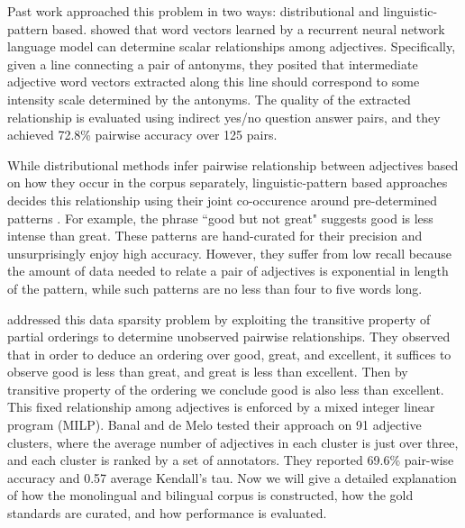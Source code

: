 Past work approached this problem in two ways: distributional and linguistic-pattern based.  showed that word vectors learned by a recurrent neural network language model can determine scalar relationships among adjectives. Specifically, given a line connecting a pair of antonyms, they posited that intermediate adjective word vectors extracted along this line should correspond to some intensity scale determined by the antonyms. The quality of the extracted relationship is evaluated using indirect yes/no question answer pairs, and they achieved 72.8\% pairwise accuracy over 125 pairs.

While distributional methods infer pairwise relationship between adjectives based on how they occur in the corpus separately, linguistic-pattern based approaches decides this relationship using their joint co-occurence around pre-determined patterns \cite{sheinman2009adjscales,schulam2010automatically,sheinman2012refining} . For example, the phrase ``good but not great" suggests good is less intense than great. These patterns are hand-curated for their precision and unsurprisingly enjoy high accuracy. However, they suffer from low recall because the amount of data needed to relate a pair of adjectives is exponential in length of the pattern, while such patterns are no less than four to five words long. 

 addressed this data sparsity problem by exploiting the transitive property of partial orderings to determine unobserved pairwise relationships. They observed that in order to deduce an ordering over good, great, and excellent, it suffices to observe good is less than great, and great is less than excellent. Then by transitive property of the ordering we conclude good is also less than excellent. This fixed relationship among adjectives is enforced by a mixed integer linear program (MILP). Banal and de Melo tested their approach on 91 adjective clusters, where the average number of adjectives in each cluster is just over three, and each cluster is ranked by a set of annotators. They reported 69.6\% pair-wise accuracy and 0.57 average Kendall's tau. Now we will give a detailed explanation of how the monolingual and bilingual corpus is constructed, how the gold standards are curated, and how performance is evaluated.\newpage









